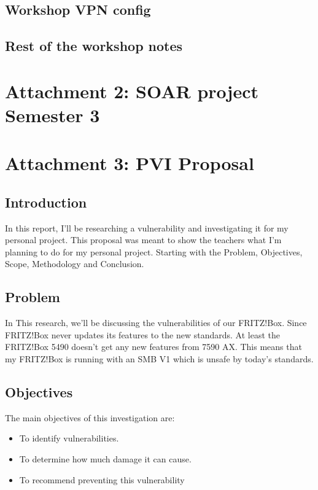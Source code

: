 \documentclass[12pt, letterpaper]{article}
\begin{document}
\subsection{Workshop VPN config}


\newpage
\subsection{Rest of the workshop notes}

\newpage
\section{Attachment 2: SOAR project Semester 3}
\label{soarpdf}

\newpage
\section{Attachment 3: PVI Proposal}
\subsection{Introduction}
In this report, I'll be researching a vulnerability and investigating it for my personal project. This proposal was meant to show the teachers what I'm planning to do for my personal project. Starting with the Problem, Objectives, Scope, Methodology and Conclusion.
\subsection{Problem}
In This research, we'll be discussing the vulnerabilities of our FRITZ!Box. Since FRITZ!Box never updates its features to the new standards. At least the FRITZ!Box 5490 doesn't get any new features from 7590 AX. This means that my FRITZ!Box is running with an SMB V1 which is unsafe by today's standards.
\subsection{Objectives}
The main objectives of this investigation are:
\begin{itemize}
    \item To identify vulnerabilities.
    \item To determine how much damage it can cause.
    \item To recommend preventing this vulnerability 
\end{itemize}
\end{document}

